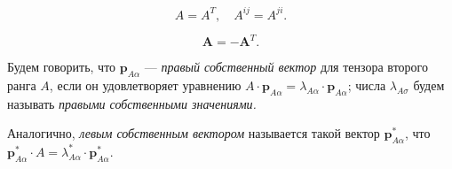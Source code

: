 
\begin{definition}
	\begin{equation*}
		A=A^T,\quad A^{ij}=A^{ji}.
	\end{equation*}
\end{definition}

\begin{definition}
	\begin{equation*}
		\mathbf{A} = -\mathbf{A}^T.
	\end{equation*}
\end{definition}

\begin{definition}
	Будем говорить, что $\mathbf{p}_{A\alpha}$ --- \emph{правый собственный
  вектор} для тензора второго ранга $A$, если
	он удовлетворяет уравнению $A \cdot \mathbf{p}_{A\alpha} = \lambda_{A\alpha}
  \cdot \mathbf{p}_{A\alpha}$; числа $\lambda_{A\sigma}$ будем называть
  \emph{правыми собственными значениями.}
	
  Аналогично, \emph{левым собственным вектором} называется такой вектор $\mathbf{p}^*_{A\alpha}$, что
	$\mathbf{p}^*_{A\alpha} \cdot A = \lambda^*_{A\alpha} \cdot \mathbf{p}^*_{A\alpha}$.
\end{definition}

